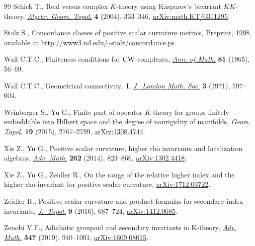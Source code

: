 \documentclass[pdftex]{sigma}
\numberwithin{equation}{section}
\begin{document}
\begin{thebibliography}{99}
Schick T., Real versus complex {$K$}-theory using {K}asparov's bivariant
 {$KK$}-theory, \href{https://doi.org/10.2140/agt.2004.4.333}{\textit{Algebr. Geom. Topol.}} \textbf{4} (2004), 333--346,
 \href{https://arxiv.org/abs/math.KT/0311295}{arXiv:math.KT/0311295}.

Stolz S., Concordance classes of positive scalar curvature metrics, {P}reprint,
 1998, available at \url{http://www3.nd.edu/~stolz/concordance.ps}.

Wall C.T.C., Finiteness conditions for {${\rm CW}$}-complexes, \href{https://doi.org/10.2307/1970382}{\textit{Ann. of
 Math.}} \textbf{81} (1965), 56--69.

Wall C.T.C., Geometrical connectivity.~{I}, \href{https://doi.org/10.1112/jlms/s2-3.4.597}{\textit{J.~London Math. Soc.}}
 \textbf{3} (1971), 597--604.

Weinberger S., Yu G., Finite part of operator {$K$}-theory for groups finitely
 embeddable into {H}ilbert space and the degree of nonrigidity of manifolds,
 \href{https://doi.org/10.2140/gt.2015.19.2767}{\textit{Geom. Topol.}} \textbf{19} (2015), 2767--2799, \href{https://arxiv.org/abs/1308.4744}{arXiv:1308.4744}.

Xie Z., Yu G., Positive scalar curvature, higher rho invariants and
 localization algebras, \href{https://doi.org/10.1016/j.aim.2014.06.001}{\textit{Adv. Math.}} \textbf{262} (2014), 823--866,
 \href{https://arxiv.org/abs/#2}{arXiv:1302.4418}.

Xie Z., Yu G., Zeidler R., On the range of the relative higher index and the
 higher rho-invariant for positive scalar curvature, \href{https://arxiv.org/abs/1712.03722}{arXiv:1712.03722}.

Zeidler R., Positive scalar curvature and product formulas for secondary index
 invariants, \href{https://doi.org/10.1112/jtopol/jtw005}{\textit{J.~Topol.}} \textbf{9} (2016), 687--724,
 \href{https://arxiv.org/abs/1412.0685}{arXiv:1412.0685}.

Zenobi V.F., Adiabatic groupoid and secondary invariants in {K}-theory,
 \href{https://doi.org/10.1016/j.aim.2019.03.003}{\textit{Adv. Math.}} \textbf{347} (2019), 940--1001, \href{https://arxiv.org/abs/1609.08015}{arXiv:1609.08015}.

\end{thebibliography}\LastPageEnding
\end{document}
